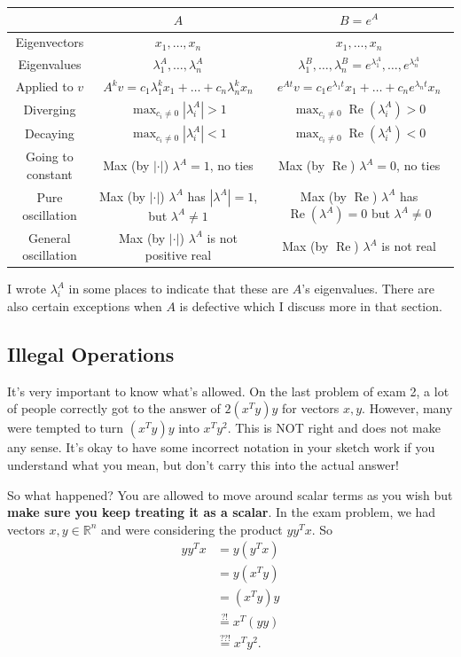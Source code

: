 \documentclass[11pt]{article}
\theoremstyle{plain} %
\theoremstyle{definition}
\theoremstyle{remark}
\DeclareMathOperator{\real}{Re}
\begin{document}
\begin{center}
\begin{tabular}{c|c|c}
&$A$&$B = e^A$\\
\hline
Eigenvectors & $x_1,\ldots,x_n$ & $x_1,\ldots,x_n$\\
Eigenvalues & $\lambda_1^A,\ldots,\lambda_n^A$ & $\lambda^B_1,\ldots,\lambda_n^B  = e^{\lambda_1^A},\ldots, e^{\lambda_n^A}$\\
Applied to $v$ & $A^k v = c_1 \lambda_1^k x_1 + \ldots + c_n \lambda_n^k x_n$ & $e^{At}v = c_1 e^{\lambda_1 t}x_1 + \ldots + c_n e^{\lambda_n t}x_n$\\
Diverging & $\max_{c_i \neq 0} |\lambda_i^A| > 1$ & $\max_{c_i \neq 0} \real{(\lambda_i^A)} > 0$\\
Decaying & $\max_{c_i \neq 0} |\lambda_i^A| < 1$ & $\max_{c_i \neq 0} \real{(\lambda_i^A)} < 0$\\
Going to constant & Max (by $|\cdot|$) $\lambda^A = 1$, no ties & Max (by $\real$) $\lambda^A = 0$, no ties\\
Pure oscillation & Max (by $|\cdot|$) $\lambda^A$ has $|\lambda^A| = 1$, but $\lambda^A \neq 1$ & Max (by $\real$) $\lambda^A$ has $\real{(\lambda^A)} = 0$ but $\lambda^A \neq 0$\\
General oscillation & Max (by $|\cdot|$) $\lambda^A$ is not positive real & Max (by $\real$) $\lambda^A$ is not real
\end{tabular}
\end{center}
I wrote $\lambda_i^A$ in some places to indicate that these are $A$'s eigenvalues. There are also certain exceptions when $A$ is defective which I discuss more in that section.

\subsection{Illegal Operations}

It's very important to know what's allowed. On the last problem of exam 2, a lot of people correctly got to the answer of $2(x^Ty)y$ for vectors $x, y$. However, many were tempted to turn $(x^Ty) y$ into $x^Ty^2$. This is NOT right and does not make any sense. It's okay to have some incorrect notation in your sketch work if you understand what you mean, but don't carry this into the actual answer!

So what happened? You are allowed to move around scalar terms as you wish but \textbf{make sure you keep treating it as a scalar}. In the exam problem, we had vectors $x, y \in \mathbb{R}^n$ and were considering the product $yy^Tx$. So
\begin{align*}
yy^Tx &= y(y^Tx)\\
&= y(x^Ty)\\
&= (x^Ty)y\\
&\stackrel{?!}{=} x^T(yy)\\
&\stackrel{??!}{=} x^Ty^2.
\end{align*}
\end{document}

